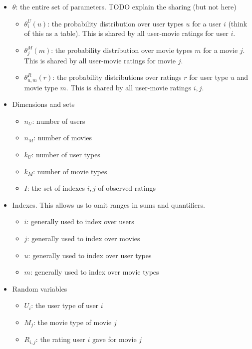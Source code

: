 \documentclass{article}
\begin{document}
\begin{itemize}
\item $\theta$: the entire set of parameters. TODO explain the sharing
  (but not here)
  \begin{itemize}
  \item $\theta^U_i(u)$: the probability distribution over user types
    $u$ for a user $i$ (think
    of this as a table). This is shared by all user-movie ratings for
    user $i$.
  \item $\theta^M_j(m)$: the probability distribution over movie
    types $m$ for a movie $j$. This is shared by all user-movie ratings for movie $j$.
  \item $\theta^R_{u,m}(r)$: the probability distributions over
    ratings $r$ for user type $u$ and movie type $m$. This is shared
    by all user-movie ratings $i,j$.
  \end{itemize}
\item Dimensions and sets
  \begin{itemize}
  \item $n_U$: number of users
  \item $n_M$: number of movies
  \item $k_U$: number of user types
  \item $k_M$: number of movie types
  \item $I$: the set of indexes $i,j$ of observed ratings
  \end{itemize}
\item Indexes. This allows us to omit ranges in sums and quantifiers.
  \begin{itemize}
  \item $i$: generally used to index over users
  \item $j$: generally used to index over movies
  \item $u$: generally used to index over user types
  \item $m$: generally used to index over movie types
  \end{itemize}
\item Random variables
  \begin{itemize}
  \item $U_i$: the user type of user $i$
  \item $M_j$: the movie type of movie $j$
  \item $R_{i,j}$: the rating user $i$ gave for movie $j$
  \end{itemize}
\end{itemize}

\footnotesize


\end{document}
